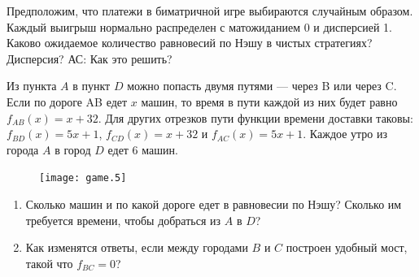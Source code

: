 
\begin{problem}
 Предположим, что платежи в биматричной игре выбираются случайным
образом. Каждый выигрыш нормально распределен с матожиданием 0 и
дисперсией 1. Каково ожидаемое количество равновесий по Нэшу в
чистых стратегиях? Дисперсия?
{\red АС: Как это решить?}
\begin{sol}

\end{sol}
\end{problem}




\begin{problem}[Мост]

Из пункта $A$ в пункт $D$ можно попасть двумя путями — через B или
через C. Если по дороге AB едет $x$ машин, то время в пути каждой
из них будет равно $f_{AB}(x)=x+32$. Для других отрезков пути
функции времени доставки таковы: $f_{BD}(x)=5x+1$, $f_{CD}(x)=x+32$ и
$f_{AC}(x)=5x+1$.
Каждое утро из города $A$ в город $D$ едет 6 машин. \par
\begin{figure}[ht]
     \texttt{[image: game.5]}
\end{figure} \par

\begin{enumerate}
\item Сколько машин и по какой дороге едет в равновесии по Нэшу?
Сколько им требуется времени, чтобы добраться из $A$ в $D$? \par
\item Как изменятся ответы, если между городами $B$ и $C$ построен
удобный мост, такой что $f_{BC}=0$?
\end{enumerate}


\begin{sol}

\end{sol}
\end{problem}

